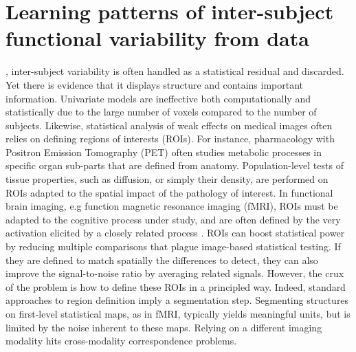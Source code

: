 \chapter{Learning patterns of inter-subject functional variability from data}\label{chap:func_var}


, inter-subject variability is often handled as a statistical residual and discarded. Yet there is evidence that it displays structure and contains important information. Univariate models are ineffective both computationally and statistically due to the large number of voxels compared to the number of subjects. Likewise,
statistical analysis of weak effects on medical images often relies on
defining regions of interests (ROIs). For instance, pharmacology
with Positron Emission Tomography (PET) often studies metabolic
processes in specific organ sub-parts that are defined from anatomy.
Population-level tests of tissue properties, such as diffusion, or
simply their density, are performed on ROIs adapted to the spatial
impact of the pathology of interest. In functional brain imaging,
e.g function magnetic resonance imaging (fMRI), ROIs must be
adapted to the cognitive process under study, and are often defined by
the very activation elicited by a closely related process  \citep{saxe2006}.
ROIs can boost statistical power by reducing multiple comparisons that
plague image-based statistical testing. If they are defined to match
spatially the differences to detect, they can also improve
the signal-to-noise ratio by averaging related signals. 
%
However, the crux of
the problem is how to define these ROIs in a principled way. 
%
Indeed, standard approaches to region definition imply a
segmentation step. 
Segmenting structures on first-level statistical maps, as in fMRI,
typically yields meaningful units, but is limited by the noise
inherent to these maps.
Relying on a different imaging modality
hits cross-modality correspondence problems.



